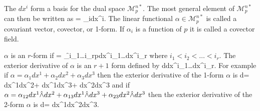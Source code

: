 The $dx^{i}$ form a basis for the dual space $\mathcal{M}^{n*}_{p}$.  The most general element of $\mathcal{M}^{n*}_{p}$ can then be written as
\be
	\alpha = \alpha_{i}dx^{i}.
\ee
The linear functional $\alpha\in\mathcal{M}^{n*}_{p}$ is called a covariant vector, covector, or 1-form.  If $\alpha_{i}$ is a function of $p$ it is
called a covector field.

$\alpha$ is an $r$-form if
\be
	\alpha = \f{\alpha_{i_{1}\dots i_{r}}}{p}dx^{i_{1}}\Wbld\dots\Wbld dx^{i_{r}}
\ee 
where $i_{1}<i_{2}<\dots<i_{r}$.  The exterior derivative of $\alpha$ is an $r+1$ form defined by
\be
	d\alpha \equiv {}\Wbld dx^{i_{1}}\Wbld\dots\Wbld dx^{i_{r}}.
\ee
For example if $\alpha = \alpha_{1}dx^{1}+\alpha_{2}dx^{2}+\alpha_{3}dx^{3}$ then the exterior derivative of the 1-form $\alpha$ is
\be
	d\alpha = dx^{1}\Wbld dx^{2}+
	          dx^{1}\Wbld dx^{3}+
	          dx^{2}\Wbld dx^{3}
\ee
and if $\alpha = \alpha_{12}dx^{1}\hat{\wedge} dx^{2}+\alpha_{13}dx^{1}\hat{\wedge} dx^{3}+\alpha_{23}dx^{2}\hat{\wedge} dx^{3}$ then the exterior derivative of
the 2-form $\alpha$ is
\be
	d\alpha = dx^{1}\Wbld dx^{2}\Wbld dx^{3}.
\ee

